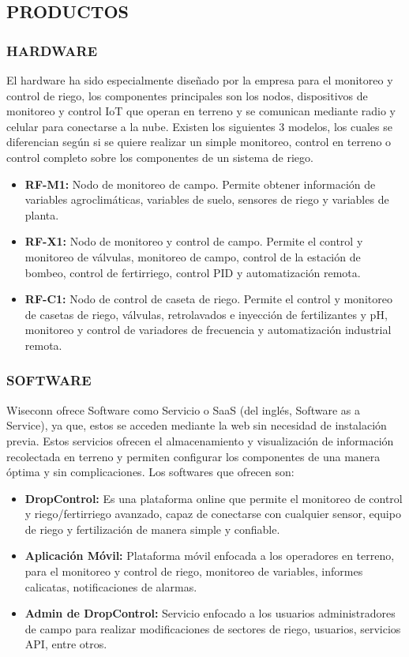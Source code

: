 \subsection{PRODUCTOS}
\subsubsection{HARDWARE}

El hardware ha sido especialmente diseñado por la empresa para el monitoreo y control de riego, los componentes principales son los nodos, dispositivos de monitoreo y control IoT que operan en terreno y se comunican mediante radio y celular para conectarse a la nube. Existen los siguientes 3 modelos, los cuales se diferencian según si se quiere realizar un simple monitoreo, control en terreno o control completo sobre los componentes de un sistema de riego.
\begin{itemize}
	\item \textbf{RF-M1:} Nodo de monitoreo de campo. Permite obtener información de variables agroclimáticas, variables de suelo, sensores de riego y variables de planta.
	\item \textbf{RF-X1:} Nodo de monitoreo y control de campo. Permite el control y monitoreo de válvulas, monitoreo de campo, control de la estación de bombeo, control de fertirriego, control PID y automatización remota.
	\item \textbf{RF-C1:} Nodo de control de caseta de riego. Permite el control y monitoreo de casetas de riego, válvulas, retrolavados e inyección de fertilizantes y pH, monitoreo y control de variadores de frecuencia y automatización industrial remota.
\end{itemize}

\subsubsection{SOFTWARE}
Wiseconn ofrece Software como Servicio o SaaS (del inglés, Software as a Service), ya que, estos se acceden mediante la web sin necesidad de instalación previa. Estos servicios ofrecen el almacenamiento y visualización de información recolectada en terreno y permiten configurar los componentes de una manera óptima y sin complicaciones. Los softwares que ofrecen son:
\begin{itemize}
    \item \textbf{DropControl:} Es una plataforma online que permite el monitoreo de control y riego/fertirriego avanzado, capaz de conectarse con cualquier sensor, equipo de riego y fertilización de manera simple y confiable.
    \item \textbf{Aplicación Móvil:} Plataforma móvil enfocada a los operadores en terreno, para el monitoreo y control de riego, monitoreo de variables, informes calicatas, notificaciones de alarmas.
    \item \textbf{Admin de DropControl:} Servicio enfocado a los usuarios administradores de campo para realizar modificaciones de sectores de riego, usuarios, servicios API, entre otros.
\end{itemize}

